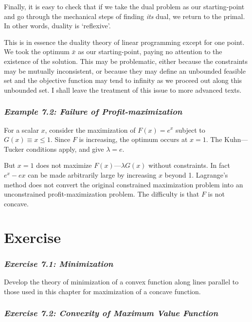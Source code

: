 Finally, it is easy to check that if we take the dual problem as our starting-point and go through the mechanical steps of finding \textit{its} dual, we return to the primal. In other words, duality is `reflexive'.

This is in essence the duality theory of linear programming except for one point. We took the optimum $\bar{x}$ as our starting-point, paying no attention to the existence of the solution. This may be problematic, either because the constraints may be mutually inconsistent, or because they may define an unbounded feasible set and the objective function may tend to infinity as we proceed out along this unbounded set. I shall leave the treatment of this issue to more advanced texts.

\subsubsection*{\textit{Example 7.2: Failure of Profit-maximization}}

For a scalar $x$, consider the maximization of $F(x) = e^x$ subject to $G(x) \equiv x \leq 1$. Since $F$ is increasing, the optimum occurs at $x=1$. The Kuhn—Tucker conditions apply, and give $\lambda = e$.

But $x=1$ does not maximize $F(x) — \lambda G(x)$ without constraints. In fact $e^x - ex$ can be made arbitrarily large by increasing $x$ beyond 1. Lagrange's method does not convert the original constrained maximization problem into an unconstrained profit-maximization problem. The difficulty is that $F$ is not concave.

\section*{Exercise}

\subsubsection*{\textit{Exercise 7.1: Minimization}}

Develop the theory of minimization of a convex function along lines parallel to those used in this chapter for maximization of a concave function.

\subsubsection*{\textit{Exercise 7.2: Convexity of Maximum Value Function}}

